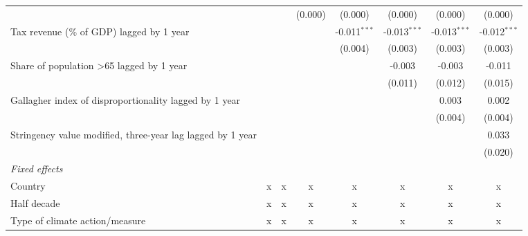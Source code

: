 \begin{tabular}{lccccccc}
                                                                        &             &             & (0.000)      & (0.000)        & (0.000)        & (0.000)        & (0.000)\\   
   Tax revenue (\% of GDP) lagged by 1 year                             &             &             &              & -0.011$^{***}$ & -0.013$^{***}$ & -0.013$^{***}$ & -0.012$^{***}$\\   
                                                                        &             &             &              & (0.004)        & (0.003)        & (0.003)        & (0.003)\\   
   Share of population >65 lagged by 1 year                             &             &             &              &                & -0.003         & -0.003         & -0.011\\   
                                                                        &             &             &              &                & (0.011)        & (0.012)        & (0.015)\\   
   Gallagher index of disproportionality lagged by 1 year               &             &             &              &                &                & 0.003          & 0.002\\   
                                                                        &             &             &              &                &                & (0.004)        & (0.004)\\   
   Stringency value modified, three-year lag lagged by 1 year           &             &             &              &                &                &                & 0.033\\   
                                                                        &             &             &              &                &                &                & (0.020)\\   
   \emph{Fixed effects}\\
   Country                                                              & x           & x           & x            & x              & x              & x              & x\\  
   Half decade                                                          & x           & x           & x            & x              & x              & x              & x\\  
   Type of climate action/measure                                       & x           & x           & x            & x              & x              & x              & x\\  

\end{tabular}
